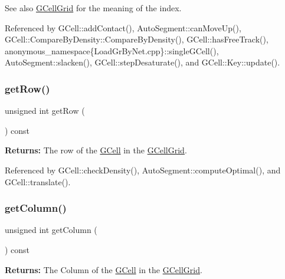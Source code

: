 \begin{DoxySeeAlso}{See also}
\hyperlink{classKatabatic_1_1GCellGrid}{G\+Cell\+Grid} for the meaning of the index. 
\end{DoxySeeAlso}


Referenced by G\+Cell\+::add\+Contact(), Auto\+Segment\+::can\+Move\+Up(), G\+Cell\+::\+Compare\+By\+Density\+::\+Compare\+By\+Density(), G\+Cell\+::has\+Free\+Track(), anonymous\+\_\+namespace\{\+Load\+Gr\+By\+Net.\+cpp\}\+::single\+G\+Cell(), Auto\+Segment\+::slacken(), G\+Cell\+::step\+Desaturate(), and G\+Cell\+::\+Key\+::update().

\mbox{\label{classKatabatic_1_1GCell_ad26f8bcf642c2620ac525cc04c8376c0}} 
\subsubsection{\texorpdfstring{get\+Row()}{getRow()}}
{\footnotesize\ttfamily unsigned int get\+Row (\begin{DoxyParamCaption}{ }\end{DoxyParamCaption}) const}

{\bfseries Returns\+:} The row of the \hyperlink{classKatabatic_1_1GCell}{G\+Cell} in the \hyperlink{classKatabatic_1_1GCellGrid}{G\+Cell\+Grid}. 

Referenced by G\+Cell\+::check\+Density(), Auto\+Segment\+::compute\+Optimal(), and G\+Cell\+::translate().

\mbox{\label{classKatabatic_1_1GCell_ac5b1a776c3eafa7f68d31292615011fa}} 
\subsubsection{\texorpdfstring{get\+Column()}{getColumn()}}
{\footnotesize\ttfamily unsigned int get\+Column (\begin{DoxyParamCaption}{ }\end{DoxyParamCaption}) const}

{\bfseries Returns\+:} The Column of the \hyperlink{classKatabatic_1_1GCell}{G\+Cell} in the \hyperlink{classKatabatic_1_1GCellGrid}{G\+Cell\+Grid}. 

